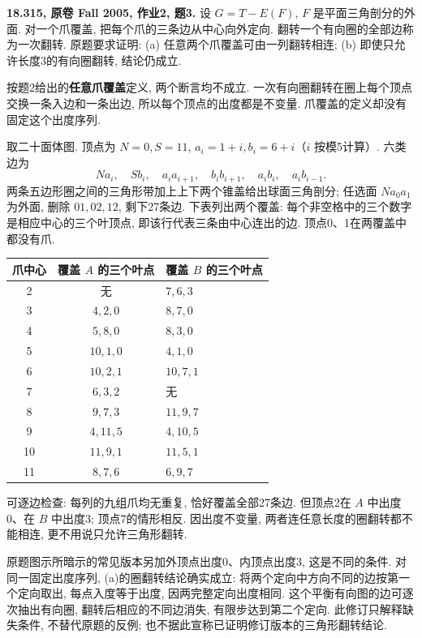 \begin{exercise}\label{mit:18315-hw2-q3}
\textbf{18.315, 原卷 Fall 2005, 作业2, 题3.}
设 $G=T-E(F)$, $F$ 是平面三角剖分的外面. 对一个爪覆盖,
把每个爪的三条边从中心向外定向. 翻转一个有向圈的全部边称为一次翻转.
原题要求证明: (a) 任意两个爪覆盖可由一列翻转相连;
(b) 即使只允许长度3的有向圈翻转, 结论仍成立.
\end{exercise}
\begin{solution}
按题2给出的\textbf{任意爪覆盖}定义, 两个断言均不成立.
一次有向圈翻转在圈上每个顶点交换一条入边和一条出边,
所以每个顶点的出度都是不变量. 爪覆盖的定义却没有固定这个出度序列.

取二十面体图. 顶点为 $N=0,S=11$,
$a_i=1+i,b_i=6+i$（$i$ 按模5计算）. 六类边为
\[
Na_i,\quad Sb_i,\quad a_ia_{i+1},\quad b_ib_{i+1},\quad a_ib_i,\quad a_ib_{i-1}.
\]
两条五边形圈之间的三角形带加上上下两个锥盖给出球面三角剖分;
任选面 $Na_0a_1$ 为外面, 删除 $01,02,12$, 剩下27条边.
下表列出两个覆盖: 每个非空格中的三个数字是相应中心的三个叶顶点,
即该行代表三条由中心连出的边. 顶点0、1在两覆盖中都没有爪.
\begin{center}
\begin{tabular}{ccl}
\toprule
爪中心 & 覆盖 $A$ 的三个叶点 & 覆盖 $B$ 的三个叶点\\
\midrule
2 & 无 & $7,6,3$\\
3 & $4,2,0$ & $8,7,0$\\
4 & $5,8,0$ & $8,3,0$\\
5 & $10,1,0$ & $4,1,0$\\
6 & $10,2,1$ & $10,7,1$\\
7 & $6,3,2$ & 无\\
8 & $9,7,3$ & $11,9,7$\\
9 & $4,11,5$ & $4,10,5$\\
10 & $11,9,1$ & $11,5,1$\\
11 & $8,7,6$ & $6,9,7$\\
\bottomrule
\end{tabular}
\end{center}
可逐边检查: 每列的九组爪均无重复, 恰好覆盖全部27条边.
但顶点2在 $A$ 中出度0、在 $B$ 中出度3;
顶点7的情形相反. 因出度不变量, 两者连任意长度的圈翻转都不能相连,
更不用说只允许三角形翻转.

原题图示所暗示的常见版本另加外顶点出度0、内顶点出度3,
这是不同的条件. 对同一固定出度序列, (a)的圈翻转结论确实成立:
将两个定向中方向不同的边按第一个定向取出,
每点入度等于出度, 因两完整定向出度相同.
这个平衡有向图的边可逐次抽出有向圈, 翻转后相应的不同边消失,
有限步达到第二个定向. 此修订只解释缺失条件, 不替代原题的反例;
也不据此宣称已证明修订版本的三角形翻转结论.
\end{solution}

